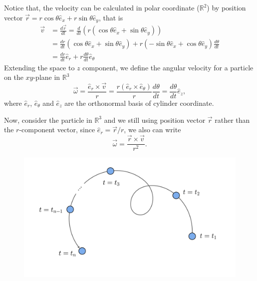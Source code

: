 \documentclass[11pt,]{beamer}
\begin{document}
\begin{frame}
	Notice that, the velocity can be calculated in polar coordinate ($\mathbb{R}^2$)
	by position vector $\vec{r} = r\cos\theta\hat{e}_{x}+ r\sin\theta\hat{e}_y$, that is 
	\begin{equation}
	\begin{aligned}
	\vec{v} &= \frac{d\vec{r}}{dt} 
	= \frac{d}{dt}\left(r\left(\cos\theta\hat{e}_{x}+ \sin\theta\hat{e}_y\right)\right)\\
	&= \frac{dr}{dt} \left(\cos\theta\hat{e}_x + \sin\theta\hat{e}_y\right) 
		+ r\left(-\sin\theta\hat{e}_x + \cos\theta\hat{e}_y\right)\frac{d\theta}{dt}\\
		&= \frac{dr}{dt}\hat{e}_r + r\frac{d\theta}{dt}\hat{e}_\theta
	\end{aligned}
	\end{equation}
	Extending the space to $z$ component, 
	we define the angular velocity for a particle on the $xy$-plane in $\mathbb{R}^3$
	\begin{equation}
	\vec{\omega} = \frac{\hat{e}_r\times \vec{v}}{r} 
	= \frac{r(\hat{e}_{r}\times\hat{e}_\theta)}{r}\frac{d\theta}{dt}
	= \frac{d\theta}{dt} \hat{e}_z,
	\end{equation}
	where $\hat{e}_r$, $\hat{e}_\theta$ and $\hat{e}_z$ are the orthonormal basis of cylinder coordinate.
\end{frame}
\begin{frame}
	Now, consider the particle in $\mathbb{R}^3$ and 
	we still using position vector $\vec{r}$ rather than the $r$-component vector,
	since $\hat{e}_r = \vec{r}/r$, we also can write 
	\begin{equation}
	\vec{\omega} = \frac{\vec{r}\times \vec{v}}{r^2}.
	\end{equation}

	\begin{figure}
    \includegraphics[page=3, width=0.8\linewidth]{imgs.pdf}
	\end{figure}
\end{frame}
\end{document}
